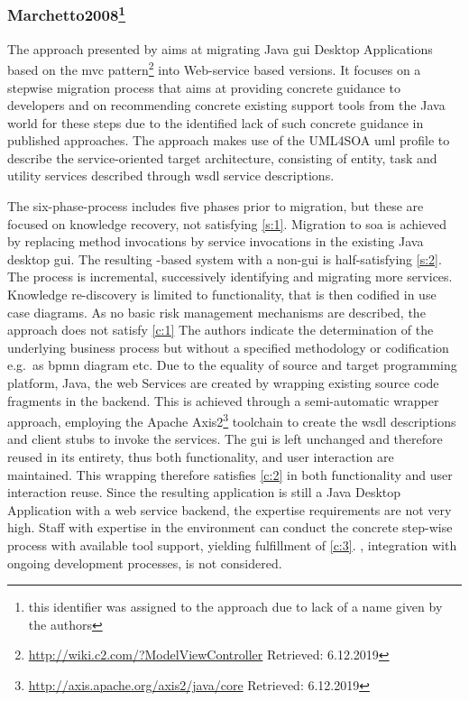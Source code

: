 \vspace{-15pt}
\hypertarget{marchetto2008}{%
\subsubsection*{\texorpdfstring{Marchetto2008\footnote{this identifier was assigned to the approach due to lack of a name given by the authors}}{Marchetto2008}}\label{marchetto2008}}

The approach presented by \citet{Marchetto2008} aims at migrating  Java \gls{gui} \glspl{Desktop Application} based on the \gls{mvc} pattern\footnote{\url{http://wiki.c2.com/?ModelViewController} Retrieved: 6.12.2019} into Web-service based versions.
It focuses on a stepwise migration process that aims at providing concrete guidance to developers and on recommending concrete existing support tools from the Java world for these steps due to the identified lack of such concrete guidance in published approaches.
The approach makes use of the UML4SOA \gls{uml} profile to describe the service-oriented target architecture, consisting of entity, task and utility services described through \gls{wsdl} \autocite{W3C2007WSDL2.0} service descriptions.

The six-phase-process includes five phases prior to migration, but these are focused on knowledge recovery, not satisfying \cref{s:1}.
Migration to \gls{soa} is achieved by replacing method invocations by service invocations in the existing Java desktop \gls{gui}.
The resulting -based system with a non-\web \gls{gui} is half-satisfying \cref{s:2}.
The process is incremental, successively identifying and migrating more services.
Knowledge re-discovery is limited to functionality, that is then codified in use case diagrams.
As no basic risk management mechanisms are described, the approach does not satisfy \cref{c:1}
The authors indicate the determination of the underlying business process but without a specified methodology or codification e.g.~as \gls{bpmn} \autocite{OMG2013BPMN} diagram etc.
Due to the equality of source and target programming platform, Java, the \gls{web} Services are created by wrapping existing source code fragments in the backend.
This is achieved through a semi-automatic wrapper approach, employing the Apache Axis2\footnote{\url{http://axis.apache.org/axis2/java/core} Retrieved: 6.12.2019} toolchain to create the \gls{wsdl} descriptions and client stubs to invoke the services.
The \gls{gui} is left unchanged and therefore reused in its entirety, thus both functionality, and user interaction are maintained.
This wrapping therefore satisfies \cref{c:2} in both functionality and user interaction reuse.
Since the resulting application is still a Java \gls{Desktop Application} with a \gls{web} service backend, the expertise requirements are not very high.
Staff with expertise in the  environment can conduct the concrete step-wise process with available tool support, yielding fulfillment of \cref{c:3}.
, integration with ongoing development processes, is not considered.

